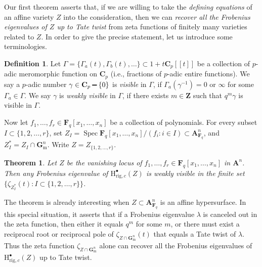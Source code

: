 \documentclass{amsart}
\numberwithin{equation}{section}
\theoremstyle{plain}
\newtheorem{theorem}[equation]{Theorem}
\theoremstyle{definition}
\newtheorem{definition}[equation]{Definition}
\renewcommand{\mathbb}{\mathbf}
\renewcommand{\setminus}{\mathbin{\rule[0.2em]{0.67em}{0.12em}}}%
\begin{document}
Our first theorem asserts that, if we are willing to take the
\emph{defining equations} of an affine variety \(Z\) into the consideration,
then we can
\emph{recover all the Frobenius eigenvalues of \(Z\) up to Tate twist}
from zeta functions of finitely many varieties related to \(Z\).
In order to give the precise statement,
let us introduce some terminologies.

\begin{definition}
Let \(\Gamma=\{\Gamma_{a}(t), \Gamma_b(t), \ldots\} \subset 1 + t\mathbb{C}_p[\![t]\!]\)
be a collection of \(p\)-adic meromorphic function on \(\mathbb{C}_{p}\)
(i.e., fractions of \(p\)-adic entire functions).
We say a \(p\)-adic number \(\gamma \in \mathbb{C}_p\setminus\{0\}\) is \emph{visible}
in \(\Gamma\), if \(\Gamma_a(\gamma^{-1})=0\) or \(\infty\) for some \(\Gamma_a \in \Gamma\).
We say \(\gamma\) is \emph{weakly visible} in \(\Gamma\), if there exists
\(m \in \mathbb{Z}\) such that \(q^{m}\gamma\) is visible in \(\Gamma\).
\end{definition}

Now let
\(f_{1},\ldots,f_{r} \in \mathbb{F}_{q}[x_1,\ldots,x_n]\) be a collection
of polynomials. For every subset \(I \subset \{1,2,\ldots,r\}\),
set \(Z_{I}= \operatorname{Spec}\mathbb{F}_q[x_1,\ldots,x_n]/(f_i:i\in I) \subset \mathbb{A}^{n}_{\mathbb{F}_q}\),
and \(Z_{I}^{\ast} = Z_{I} \cap \mathbb{G}_{\mathrm{m}}^{n}\).
Write \(Z=Z_{\{1,2,\ldots,r\}}\).

\begin{theorem}%
\label{theorem:cancellation}
Let \(Z\) be the vanishing locus of
\(f_{1},\ldots,f_{r} \in \mathbb{F}_{q}[x_{1},\ldots,x_{n}]\) in
\(\mathbb{A}^{n}\).  Then any Frobenius eigenvalue of
\(\mathrm{H}^{\bullet}_{\mathrm{rig},c}(Z)\) is weakly visible in the
finite set
\(\{\zeta_{Z_{I}^{\ast}}(t): {I\subset\{1,2,\ldots,r\}}\}\).
\end{theorem}

The theorem is already interesting when
\(Z\subset\mathbb{A}^n_{\mathbb{F}_q}\) is an affine hypersurface.  In
this special situation, it asserts that if a Frobenius eigenvalue
\(\lambda\) is canceled out in the zeta function, then either it
equals \(q^m\) for some \(m\), or there must exist a reciprocal root
or reciprocal pole of \(\zeta_{Z\cap \mathbb{G}_{\mathrm{m}}^n}(t)\)
that equals a Tate twist of \(\lambda\).  Thus the zeta function
\(\zeta_{Z\cap\mathbb{G}_{\mathrm{m}}^n}\) alone can recover all the
Frobenius eigenvalues of \(\mathrm{H}^{\bullet}_{\mathrm{rig},c}(Z)\)
up to Tate twist.
\end{document}
